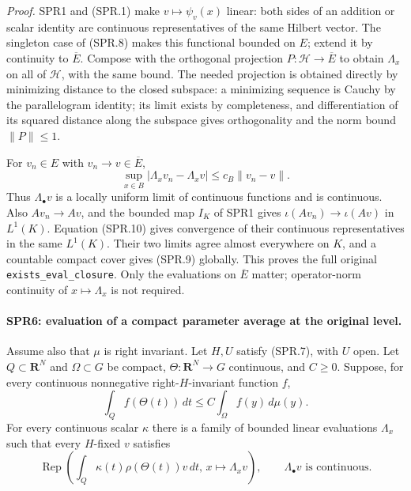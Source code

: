 \documentclass[11pt,a4paper]{article}
\numberwithin{equation}{section}
\theoremstyle{remark}\newtheorem{remark}[theorem]{Remark}
\begin{document}
\emph{Proof.}
SPR1 and (SPR.1) make \(v\mapsto\psi_v(x)\) linear:
both sides of an addition or scalar identity are continuous
representatives of the same Hilbert vector.
The singleton case of (SPR.8) makes this functional bounded on
\(E\); extend it by continuity to \(\overline E\).
Compose with the orthogonal projection
\(P:\mathcal H\to\overline E\) to obtain \(\Lambda_x\) on all of
\(\mathcal H\), with the same bound.
The needed projection is obtained directly by minimizing distance
to the closed subspace: a minimizing sequence is Cauchy by the
parallelogram identity; its limit exists by completeness, and
differentiation of its squared distance along the subspace gives
orthogonality and the norm bound \(\|P\|\le1\).

For \(v_n\in E\) with \(v_n\to v\in\overline E\),
\[
 \sup_{x\in B}|\Lambda_xv_n-\Lambda_xv|
                       \le c_B\|v_n-v\|.
 \tag{SPR.10}
\]
Thus \(\Lambda_\bullet v\) is a locally uniform limit of continuous
functions and is continuous.  Also \(Av_n\to Av\), and the bounded
map \(I_K\) of SPR1 gives
\(\iota(Av_n)\to\iota(Av)\) in \(L^1(K)\).
Equation (SPR.10) gives convergence of their continuous
representatives in the same \(L^1(K)\).
Their two limits agree almost everywhere on \(K\), and a countable
compact cover gives (SPR.9) globally.
This proves the full original \texttt{exists\_\allowbreak eval\_\allowbreak closure}.
Only the evaluations on \(\overline E\) matter; operator-norm
continuity of \(x\mapsto\Lambda_x\) is not required.

\paragraph{SPR6: evaluation of a compact parameter average at the original level.}
\label{claim:SPR6}
Assume also that \(\mu\) is right invariant.
Let \(H,U\) satisfy (SPR.7), with \(U\) open.
Let \(Q\subset\mathbf R^N\) and \(\Omega\subset G\) be compact,
\(\Theta:\mathbf R^N\to G\) continuous, and \(C\ge0\).
Suppose, for every continuous nonnegative right-\(H\)-invariant
function \(f\),
\[
             \int_Q f(\Theta(t))\,dt
                  \le C\int_\Omega f(y)\,d\mu(y).
 \tag{SPR.11}
\]
For every continuous scalar \(\kappa\) there is a family of bounded
linear evaluations \(\Lambda_x\) such that every \(H\)-fixed \(v\)
satisfies
\[
 \operatorname{Rep}\left(
       \int_Q\kappa(t)\rho(\Theta(t))v\,dt,\,
       x\longmapsto\Lambda_xv\right),
 \qquad \Lambda_\bullet v\text{ is continuous}.
 \tag{SPR.12}
\]
\end{document}
